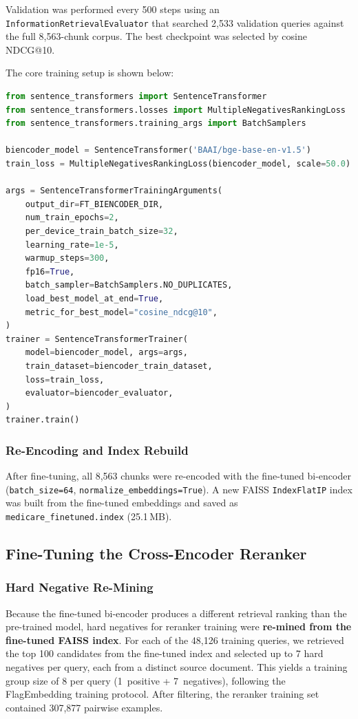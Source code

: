 \documentclass[10pt, letterpaper]{article}
\begin{document}
Validation was performed every 500 steps using an \texttt{InformationRetrievalEvaluator}
that searched 2,533 validation queries against the full 8,563-chunk corpus. The best
checkpoint was selected by cosine NDCG@10.

The core training setup is shown below:

\begin{lstlisting}[language=Python, caption=Bi-encoder fine-tuning with MNRL loss]
from sentence_transformers import SentenceTransformer
from sentence_transformers.losses import MultipleNegativesRankingLoss
from sentence_transformers.training_args import BatchSamplers

biencoder_model = SentenceTransformer('BAAI/bge-base-en-v1.5')
train_loss = MultipleNegativesRankingLoss(biencoder_model, scale=50.0)

args = SentenceTransformerTrainingArguments(
    output_dir=FT_BIENCODER_DIR,
    num_train_epochs=2,
    per_device_train_batch_size=32,
    learning_rate=1e-5,
    warmup_steps=300,
    fp16=True,
    batch_sampler=BatchSamplers.NO_DUPLICATES,
    load_best_model_at_end=True,
    metric_for_best_model="cosine_ndcg@10",
)
trainer = SentenceTransformerTrainer(
    model=biencoder_model, args=args,
    train_dataset=biencoder_train_dataset,
    loss=train_loss,
    evaluator=biencoder_evaluator,
)
trainer.train()
\end{lstlisting}

\subsubsection{Re-Encoding and Index Rebuild}

After fine-tuning, all 8,563 chunks were re-encoded with the fine-tuned bi-encoder
(\texttt{batch\_size=64}, \texttt{normalize\_embeddings=True}). A new FAISS
\texttt{IndexFlatIP} index was built from the fine-tuned embeddings and saved as
\texttt{medicare\_finetuned.index} (25.1\,MB).

\subsection{Fine-Tuning the Cross-Encoder Reranker}

\subsubsection{Hard Negative Re-Mining}

Because the fine-tuned bi-encoder produces a different retrieval ranking than the
pre-trained model, hard negatives for reranker training were \textbf{re-mined from the
fine-tuned FAISS index}. For each of the 48,126 training queries, we retrieved the top
100 candidates from the fine-tuned index and selected up to 7 hard negatives per query,
each from a distinct source document. This yields a training group size of 8 per query
(1~positive + 7~negatives), following the FlagEmbedding training protocol. After
filtering, the reranker training set contained 307,877 pairwise examples.
\end{document}

